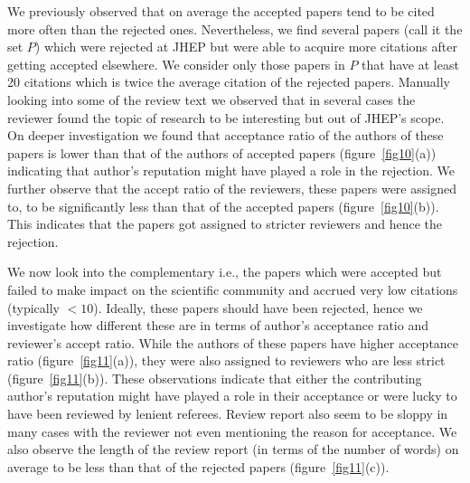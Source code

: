  We previously observed that on average the accepted papers tend to be cited more often than the rejected ones. Nevertheless, we find several papers (call it the set $P$) which were rejected at JHEP but were able to acquire more citations after getting accepted elsewhere. We consider only those papers in $P$ that have at least 20 citations which is twice the average citation of the rejected papers.
Manually looking into some of the review text we observed that in several cases the reviewer found the topic of research to be interesting but out of JHEP's scope. On deeper investigation we found that acceptance ratio of the authors of these papers is lower than that of the authors of accepted papers (figure~\ref{fig10}(a)) indicating that author's reputation might have played a role in the rejection. We further observe that the accept ratio of the reviewers, these papers were assigned to, to be significantly less than that of the accepted papers (figure~\ref{fig10}(b)). This indicates that the papers got assigned to stricter reviewers and hence the rejection.

 We now look into the complementary i.e., the papers which were accepted but failed to make impact on the scientific community and accrued very low citations (typically $< 10$). Ideally, these papers should have been rejected, hence we investigate how different these are in terms of author's acceptance ratio and reviewer's accept ratio. While the authors of these papers have higher acceptance ratio (figure~\ref{fig11}(a)), they were also assigned to reviewers who are less strict (figure~\ref{fig11}(b)). These observations indicate that either the contributing author's reputation might have played a role in their acceptance or were lucky to have been reviewed by lenient referees. Review report also seem to be sloppy in many cases with the reviewer not even mentioning the reason for acceptance. We also observe the length of the review report (in terms of the number of words) on average to be less than that of the rejected papers (figure~\ref{fig11}(c)). 

